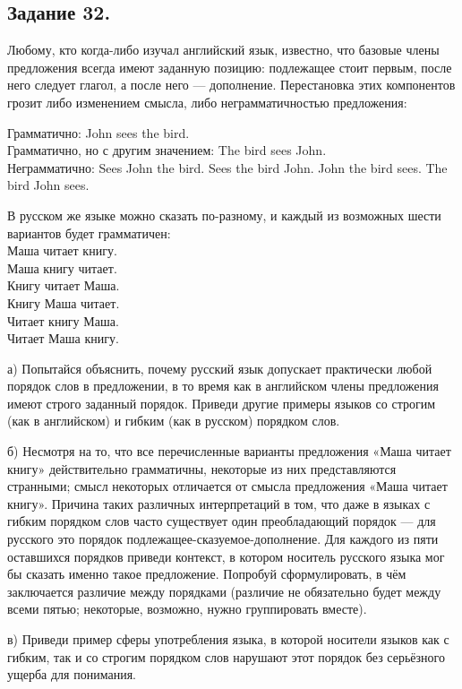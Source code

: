 \subsection*{Задание 32.}
    Любому, кто когда-либо изучал английский язык, известно, что базовые члены предложения всегда имеют заданную позицию: подлежащее стоит первым, после него следует глагол, а после него — дополнение. Перестановка этих компонентов грозит либо изменением смысла, либо неграмматичностью предложения:

    Грамматично: John sees the bird. \\
    Грамматично, но с другим значением: The bird sees John. \\
    Неграмматично: Sees John the bird. Sees the bird John. John the bird sees.  The bird John sees. 
    
    В русском же языке можно сказать по-разному, и каждый из возможных шести вариантов будет грамматичен:
    \\
    Маша читает книгу. \\
    Маша книгу читает. \\
    Книгу читает Маша. \\
    Книгу Маша читает. \\
    Читает книгу Маша. \\
    Читает Маша книгу.
    
    \begin{compactenum}
        \setlength\itemsep{-0.25em}
        \item[а)] Попытайся объяснить, почему русский язык допускает практически любой порядок слов в предложении, в то время как в английском члены предложения имеют строго заданный порядок. Приведи другие примеры языков со строгим (как в английском) и гибким (как в русском) порядком слов.
        \item[б)] Несмотря на то, что все перечисленные варианты предложения «Маша читает книгу» действительно грамматичны, некоторые из них представляются странными; смысл некоторых отличается от смысла предложения «Маша читает книгу». Причина таких различных интерпретаций в том, что даже в языках с гибким порядком слов часто существует один преобладающий порядок — для русского это порядок подлежащее-сказуемое-дополнение. Для каждого из пяти оставшихся порядков приведи контекст, в котором носитель русского языка мог бы сказать именно такое предложение. Попробуй сформулировать, в чём заключается различие между порядками (различие не обязательно будет между всеми пятью; некоторые, возможно, нужно группировать вместе).
        \item[в)] Приведи пример сферы употребления языка, в которой носители языков как с гибким, так и со строгим порядком слов нарушают этот порядок без серьёзного ущерба для понимания.
    \end{compactenum}
    
